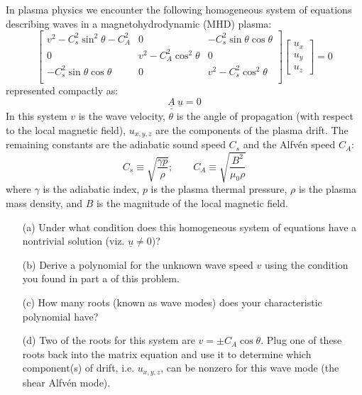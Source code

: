 \documentclass{article}
\begin{document}
\begin{enumerate}
  In plasma physics we encounter the following homogeneous system of equations describing waves in a magnetohydrodynamic (MHD) plasma:
  \begin{equation}
    \left[
    \begin{array}{ccc}
      v^2 - C_s^2 \sin^2 \theta - C_A^2 & 0 & -C_s^2 \sin \theta \cos \theta \\
      0 & v^2 - C_A^2 \cos^2 \theta & 0 \\
      -C_s^2 \sin \theta \cos \theta & 0 & v^2-C_s^2 \cos^2 \theta \\
    \end{array}
    \right]
    \left[
    \begin{array}{c}
    u_x \\
    u_y \\
    u_z
    \end{array}
    \right] = 0
  \end{equation}
  represented compactly as:
  \begin{equation}
    \underline{\underline{A}} ~ \underline{u} = 0
  \end{equation}
  In this system $v$ is the wave velocity, $\theta$ is the angle of propagation (with respect to the local magnetic field), $u_{x,y,z}$ are the components of the plasma drift.  The remaining constants are the adiabatic sound speed $C_s$ and the Alfv\'en speed $C_A$:
  \begin{equation}
    C_s \equiv \sqrt{ \frac{\gamma p}{\rho} }; \qquad C_A \equiv \sqrt{ \frac{B^2}{\mu_0 \rho} }
  \end{equation}
  where $\gamma$ is the adiabatic index, $p$ is the plasma thermal pressure, $\rho$ is the plasma mass density, and $B$ is the magnitude of the local magnetic field.  
  \begin{enumerate}
    \item[(a)]  Under what condition does this homogeneous system of equations have a nontrivial solution (viz. $\underline{u} \ne 0$)?
    \item[(b)]  Derive a polynomial for the unknown wave speed $v$ using the condition you found in part a of this problem.
    \item[(c)]  How many roots (known as wave modes) does your characteristic polynomial have?
    \item[(d)]  Two of the roots for this system are $v = \pm C_A \cos \theta$.  Plug one of these roots back into the matrix equation and use it to determine which component(s) of drift, i.e. $u_{x,y,z}$, can be nonzero for this wave mode (the shear Alfv\'en mode).  

\end{enumerate}
\end{enumerate}
\end{document}
